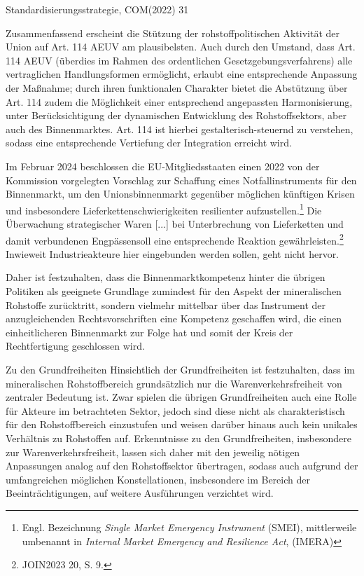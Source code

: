 \documentclass[12pt,a4paper,oneside]{book} %
\begin{document}
	
Standardisierungsstrategie, COM(2022) 31
	
Zusammenfassend erscheint die Stützung der rohstoffpolitischen Aktivität der Union auf Art. 114 AEUV am plausibelsten. Auch durch den Umstand, dass Art. 114 AEUV (überdies im Rahmen des ordentlichen Gesetzgebungsverfahrens) alle vertraglichen Handlungsformen ermöglicht, erlaubt eine entsprechende Anpassung der Maßnahme; durch ihren funktionalen Charakter bietet die Abstützung über Art. 114 zudem die Möglichkeit einer entsprechend angepassten Harmonisierung, unter Berücksichtigung der dynamischen Entwicklung des Rohstoffsektors, aber auch des Binnenmarktes. Art. 114 ist hierbei gestalterisch-steuernd zu verstehen, sodass eine entsprechende Vertiefung der Integration erreicht wird.\autocite{Grabitz/Hilf/Nettesheim/Tietje AEUV Art. 114 Rn. 34}

Im Februar 2024 beschlossen die EU-Mitgliedsstaaten einen 2022 von der Kommission vorgelegten Vorschlag zur Schaffung eines \glqq Notfallinstruments für den Binnenmarkt\grqq, um den Unionsbinnenmarkt gegenüber möglichen künftigen Krisen und insbesondere Lieferkettenschwierigkeiten resilienter aufzustellen.\footnote{Engl. Bezeichnung \textit{Single Market Emergency Instrument} (SMEI), mittlerweile umbenannt in \textit{Internal Market Emergency and Resilience Act}, (IMERA)}
Die \glqq Überwachung strategischer Waren [...] bei Unterbrechung von Lieferketten und damit verbundenen Engpässen\grqq soll eine entsprechende Reaktion gewährleisten.\footnote{JOIN2023 20, S. 9.} Inwieweit Industrieakteure hier eingebunden werden sollen, geht nicht hervor.

Daher ist festzuhalten, dass die Binnenmarktkompetenz hinter die übrigen Politiken als geeignete Grundlage zumindest für den Aspekt der mineralischen Rohstoffe zurücktritt, sondern vielmehr mittelbar über das Instrument der anzugleichenden Rechtsvorschriften eine Kompetenz geschaffen wird, die einen einheitlicheren Binnenmarkt zur Folge hat und somit der Kreis der Rechtfertigung geschlossen wird.


Zu den Grundfreiheiten
Hinsichtlich der Grundfreiheiten ist festzuhalten, dass im mineralischen Rohstoffbereich grundsätzlich nur die Warenverkehrsfreiheit von zentraler Bedeutung ist. Zwar spielen die übrigen Grundfreiheiten auch eine Rolle für Akteure im betrachteten Sektor, jedoch sind diese nicht als charakteristisch für den Rohstoffbereich einzustufen und weisen darüber hinaus auch kein unikales Verhältnis zu Rohstoffen auf.\autocite[So auch]{Frau 2025, S. 395} Erkenntnisse zu den Grundfreiheiten, insbesondere zur Warenverkehrsfreiheit, lassen sich daher mit den jeweilig nötigen Anpassungen analog auf den Rohstoffsektor übertragen, sodass auch aufgrund der umfangreichen möglichen Konstellationen, insbesondere im Bereich der Beeinträchtigungen, auf weitere Ausführungen verzichtet wird.
	
\end{document}
